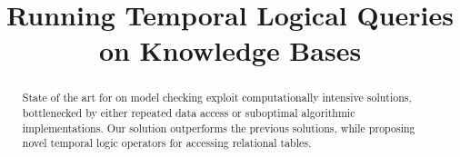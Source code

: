 \documentclass[11pt]{article}
\begin{document}
\title{Running Temporal Logical Queries on Knowledge Bases}
\author{\vspace{-10ex}}
\date{\vspace{-10ex}}

\maketitle
~\\
\begin{abstract}
State of the art for on model checking exploit computationally intensive solutions, bottlenecked by either repeated data access or suboptimal algorithmic implementations. Our solution outperforms the previous solutions, while proposing novel temporal logic operators for accessing relational tables.	


\end{abstract}
\end{document}
